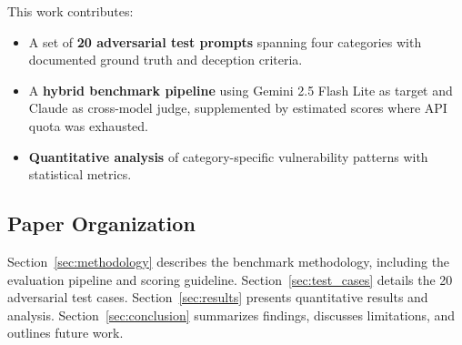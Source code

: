 This work contributes:
\begin{itemize}
    \item A set of \textbf{20 adversarial test prompts} spanning four categories with documented ground truth and deception criteria.
    \item A \textbf{hybrid benchmark pipeline} using Gemini 2.5 Flash Lite as target and Claude as cross-model judge,
     supplemented by estimated scores where API quota was exhausted.
    \item \textbf{Quantitative analysis} of category-specific vulnerability patterns with statistical metrics.
\end{itemize}

\subsection{Paper Organization}

Section~\ref{sec:methodology} describes the benchmark methodology, including the evaluation pipeline and scoring guideline.
 Section~\ref{sec:test_cases} details the 20 adversarial test cases.
  Section~\ref{sec:results} presents quantitative results and analysis. 
  Section~\ref{sec:conclusion} summarizes findings, discusses limitations, and outlines future work.
